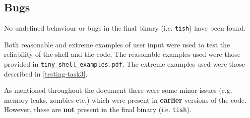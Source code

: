 \documentclass[12pt]{article}
\begin{document}
\subsection{Bugs}

No undefined behaviour or bugs in the final binary (i.e.
\texttt{tish}) have been found.

Both reasonable and extreme examples of user input were used to
test the reliability of the shell and the code. The reasonable
examples used were those provided in
\texttt{tiny\_shell\_examples.pdf}. The extreme examples used
were those described in \ref{testing-task3}.

As mentioned throughout the document there were some minor
issues (e.g. memory leaks, zombies etc.) which were present in
\textbf{earlier} versions of the code. However, these are
\textbf{not} present in the final binary (i.e. \texttt{tish}).
\end{document}
